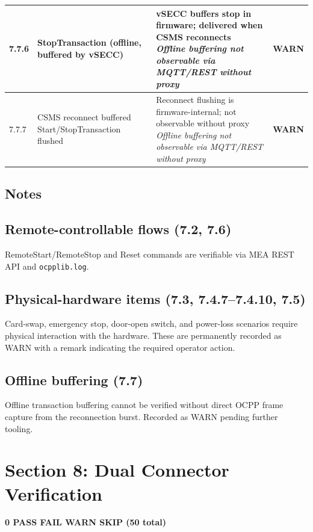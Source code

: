 \documentclass[10pt, a4paper]{article}
\begin{document}
\begin{longtable}{|L{1cm}|L{5.5cm}|M{7cm}|C{1.8cm}|}
\hline
\small 7.7.6 & \small StopTransaction (offline, buffered by vSECC) & vSECC buffers stop in firmware; delivered when CSMS reconnects{\newline\normalfont\footnotesize\itshape Offline buffering not observable via MQTT/REST without proxy} & \textcolor{warnorange}{\textbf{WARN}} \\
\hline
\small 7.7.7 & \small CSMS reconnect  buffered Start/StopTransaction flushed & Reconnect flushing is firmware-internal; not observable without proxy{\newline\normalfont\footnotesize\itshape Offline buffering not observable via MQTT/REST without proxy} & \textcolor{warnorange}{\textbf{WARN}} \\
\hline
\end{longtable}
\normalsize
\subsection*{Notes}

\subsection*{Remote-controllable flows (7.2, 7.6)}
RemoteStart/RemoteStop and Reset commands are verifiable via MEA REST API and \texttt{ocpplib.log}.

\subsection*{Physical-hardware items (7.3, 7.4.7--7.4.10, 7.5)}
Card-swap, emergency stop, door-open switch, and power-loss scenarios require
physical interaction with the hardware. These are permanently recorded as WARN
with a remark indicating the required operator action.

\subsection*{Offline buffering (7.7)}
Offline transaction buffering cannot be verified without direct OCPP frame capture
from the reconnection burst. Recorded as WARN pending further tooling.



\newpage
\section{Section 8: Dual Connector Verification}
\textbf{0 PASS  FAIL  WARN  SKIP \quad (50 total)}
\end{document}
